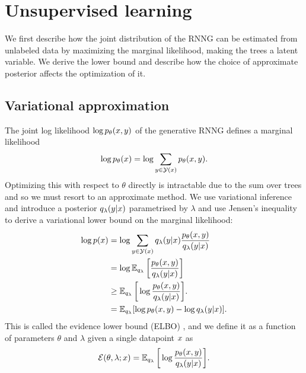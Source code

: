 \section{Unsupervised learning}
  We first describe how the joint distribution of the RNNG can be estimated from unlabeled data by maximizing the marginal likelihood, making the trees a latent variable. We derive the lower bound and describe how the choice of approximate posterior affects the optimization of it.

  \subsection{Variational approximation}
    The joint log likelihood $\log p_{\theta}(x, y)$ of the generative RNNG defines a marginal likelihood
    \begin{align*}
      \log p_{\theta}(x) = \log \sum_{y \in \mathcal{Y}(x)} p_{\theta}(x, y).
    \end{align*}
    Optimizing this with respect to $\theta$ directly is intractable due to the sum over trees and so we must resort to an approximate method. We use variational inference \citep{jordan1999vi,blei2016vi} and introduce a posterior $q_{\lambda}(y | x)$ parametrised by $\lambda$ and use Jensen's inequality to derive a variational lower bound on the marginal likelihood:
    \begin{align}
      \label{eq:lowerbound}
      \log p (x)
        &= \log \sum_{y  \in \mathcal{Y}(x)} q_{\lambda}(y |x) \frac{p_{\theta}(x,y )}{q_{\lambda}(y | x)} \nonumber  \\
        &= \log \operatorname{\mathbb{E}}_{q_{\lambda}} \bigg[ \frac{p_{\theta}(x,y )}{ q_{\lambda}(y | x)} \bigg] \nonumber  \\
        &\geq \operatorname{\mathbb{E}}_{q_{\lambda}} \bigg[ \log \frac{p_{\theta}(x,y )}{q_{\lambda}(y | x)} \bigg].  \nonumber \\
        &= \operatorname{\mathbb{E}}_{q_{\lambda}} [\log p_{\theta}(x,y )  - \log q_{\lambda}(y | x) ].
    \end{align}
    This is called the evidence lower bound (ELBO) \citep{blei2016vi}, and we define it as a function of parameters $\theta$ and $\lambda$ given a single datapoint $x$ as
    \begin{align}
      \operatorname{\mathcal{E}}(\theta, \lambda; x) = \operatorname{\mathbb{E}}_{q_{\lambda}} \bigg[ \log \frac{p_{\theta}(x,y )}{q_{\lambda}(y | x)} \bigg].
    \end{align}

